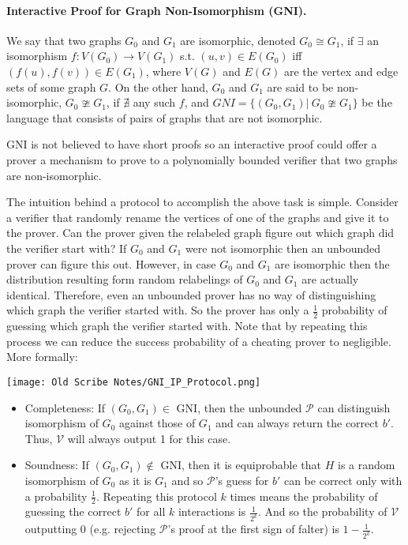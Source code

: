 \paragraph{Interactive Proof for Graph Non-Isomorphism (GNI).} We say that two graphs $G_0$ and $G_1$ are isomorphic, denoted $G_0 \cong G_1$, if $\exists$ an isomorphism $f: V(G_0) \rightarrow V(G_1)$ s.t. $(u,v)\in E(G_0)$ iff $(f(u),f(v))\in E(G_1)$, where $V(G)$ and $E(G)$ are the vertex and edge sets of some graph $G$. On the other hand, $G_0$ and $G_1$ are said to be non-isomorphic, $G_0 \ncong G_1$, if $\nexists$ any such $f$, and $GNI=\lbrace(G_0,G_1)|\  G_0\ncong G_1\rbrace$ be the language that consists of pairs of graphs that are not isomorphic. 

GNI is not believed to have short proofs so an interactive proof could offer a prover a mechanism to prove to a polynomially bounded verifier that two graphs are non-isomorphic. 


The intuition behind a protocol to accomplish the above task is simple. Consider a verifier that randomly rename the vertices of one of the graphs and give it to the prover. Can the prover given the relabeled graph figure out which graph did the verifier start with?  If $G_0$ and $G_1$ were not isomorphic  then an unbounded prover can figure this out. However, in case $G_0$ and $G_1$ {are} isomorphic then the distribution resulting form random relabelings of $G_0$ and $G_1$ are actually identical. Therefore, even an unbounded prover has no way of distinguishing which graph the verifier started with. So the prover has only a $\frac12$ probability of guessing which graph the verifier started with. Note that by repeating this process we can reduce the success probability of a cheating prover to negligible. More formally:


		\begin{center}
			\texttt{[image: Old Scribe Notes/GNI\_IP\_Protocol.png]}
		\end{center}

		\begin{itemize}
			\item Completeness: If $(G_0,G_1)\in$ GNI, then the unbounded $\mathcal{P}$ can distinguish isomorphism of $G_0$ against those of $G_1$ and can always return the correct $b'$.  Thus, $\mathcal{V}$ will always output 1 for this case.
			\item Soundness: If $(G_0,G_1)\notin$ GNI, then it is equiprobable that $H$ is a random isomorphism of $G_0$ as it is $G_1$ and so $\mathcal{P}$'s guess for $b'$ can be correct only with a probability $\frac{1}{2}$.  Repeating this protocol $k$ times means the probability of guessing the correct $b'$ for all $k$ interactions is $\frac{1}{2^k}$.  And so the probability of $\mathcal{V}$ outputting 0 (e.g. rejecting $\mathcal{P}$'s proof at the first sign of falter) is $1-\frac{1}{2^k}$. 
		\end{itemize}

